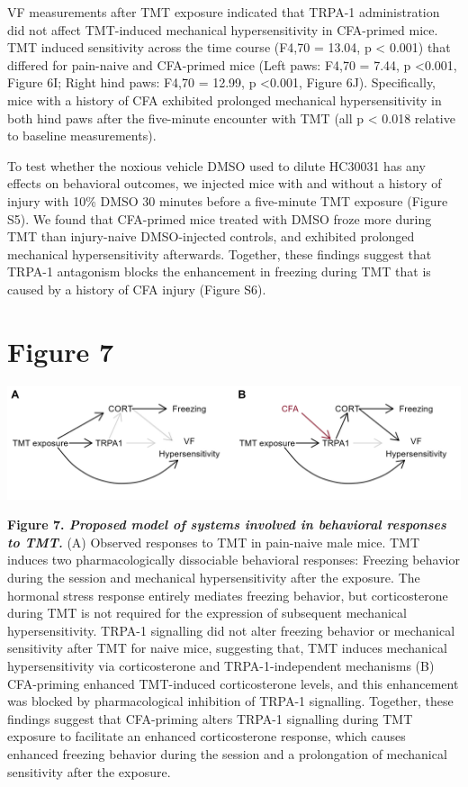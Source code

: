 \documentclass[
]{book}
\begin{document}
VF measurements after TMT exposure indicated that TRPA-1 administration did not affect TMT-induced mechanical hypersensitivity in CFA-primed mice. TMT induced sensitivity across the time course (F4,70 = 13.04, p \textless{} 0.001) that differed for pain-naive and CFA-primed mice (Left paws: F4,70 = 7.44, p \textless0.001, Figure 6I; Right hind paws: F4,70 = 12.99, p \textless0.001, Figure 6J). Specifically, mice with a history of CFA exhibited prolonged mechanical hypersensitivity in both hind paws after the five-minute encounter with TMT (all p \textless{} 0.018 relative to baseline measurements).

To test whether the noxious vehicle DMSO used to dilute HC30031 has any effects on behavioral outcomes, we injected mice with and without a history of injury with 10\% DMSO 30 minutes before a five-minute TMT exposure (Figure S5). We found that CFA-primed mice treated with DMSO froze more during TMT than injury-naive DMSO-injected controls, and exhibited prolonged mechanical hypersensitivity afterwards. Together, these findings suggest that TRPA-1 antagonism blocks the enhancement in freezing during TMT that is caused by a history of CFA injury (Figure S6).

\chapter*{Figure 7}\label{figure-7}

\includegraphics[width=33.33in]{Figs/7_Diagram}

\textbf{Figure 7. \emph{Proposed model of systems involved in behavioral responses to TMT.}} (A) Observed responses to TMT in pain-naive male mice. TMT induces two pharmacologically dissociable behavioral responses: Freezing behavior during the session and mechanical hypersensitivity after the exposure. The hormonal stress response entirely mediates freezing behavior, but corticosterone during TMT is not required for the expression of subsequent mechanical hypersensitivity. TRPA-1 signalling did not alter freezing behavior or mechanical sensitivity after TMT for naive mice, suggesting that, TMT induces mechanical hypersensitivity via corticosterone and TRPA-1-independent mechanisms (B) CFA-priming enhanced TMT-induced corticosterone levels, and this enhancement was blocked by pharmacological inhibition of TRPA-1 signalling. Together, these findings suggest that CFA-priming alters TRPA-1 signalling during TMT exposure to facilitate an enhanced corticosterone response, which causes enhanced freezing behavior during the session and a prolongation of mechanical sensitivity after the exposure.
\end{document}
